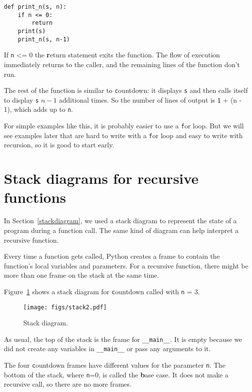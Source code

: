 \documentclass[
DIV=11,
fontsize=13,
twoside,
headinclude=false,
titlepage=firstiscover,
abstract=true,
headsepline=true,
footsepline=true,
chapterprefix=true, %
headings=big,
bibliography=totoc,%
captions=tableheading
]{scrbook}
\theoremstyle{definition}
\begin{document}
\begin{lstlisting}
def print_n(s, n):
    if n <= 0:
        return
    print(s)
    print_n(s, n-1)
\end{lstlisting}
%
If {\texttt n <= 0} the {\textbf return statement} exits the function.  The
flow of execution immediately returns to the caller, and the remaining
lines of the function don't run.

The rest of the function is similar to {\texttt countdown}: it displays
{\texttt s} and then calls itself to display {\texttt s} $n-1$ additional
times.  So the number of lines of output is {\texttt 1 + (n - 1)}, which
adds up to {\texttt n}.

For simple examples like this, it is probably easier to use a {\texttt
for} loop.  But we will see examples later that are hard to write
with a {\texttt for} loop and easy to write with recursion, so it is
good to start early.


\section{Stack diagrams for recursive functions}
\label{recursive.stack}

In Section~\ref{stackdiagram}, we used a stack diagram to represent
the state of a program during a function call.  The same kind of
diagram can help interpret a recursive function.

Every time a function gets called, Python creates a
frame to contain the function's local variables and parameters.
For a recursive function, there might be more than one frame on the
stack at the same time.

Figure~\ref{fig.stack2} shows a stack diagram for {\texttt countdown} called with
{\texttt n = 3}.

\begin{figure}
\centerline
{\texttt{[image: figs/stack2.pdf]}}
\caption{Stack diagram.}
\label{fig.stack2}
\end{figure}


As usual, the top of the stack is the frame for \verb"__main__".
It is empty because we did not create any variables in 
\verb"__main__" or pass any arguments to it.

The four {\texttt countdown} frames have different values for the
parameter {\texttt n}.  The bottom of the stack, where {\texttt n=0}, is
called the {\textbf base case}.  It does not make a recursive call, so
there are no more frames.
\end{document}
